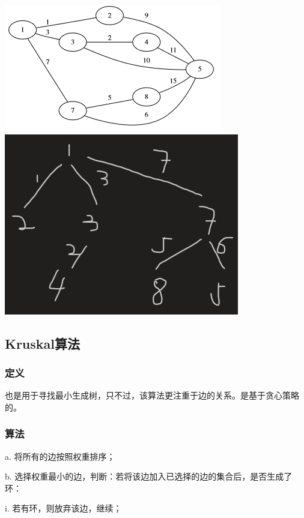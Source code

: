 \documentclass[a4paper]{article}    %
\begin{document}
\begin{center}
    \includegraphics[scale=0.6]{23.png}\qquad
    \includegraphics[scale=0.4]{24.png}
\end{center}

\subsection{Kruskal算法}

\subsubsection{定义}

也是用于寻找最小生成树，只不过，该算法更注重于边的关系。是基于贪心策略的。

\subsubsection{算法}

a. 将所有的边按照权重排序；

b. 选择权重最小的边，判断：若将该边加入已选择的边的集合后，是否生成了环：

\indent\indent i. 若有环，则放弃该边，继续；
\end{document}
